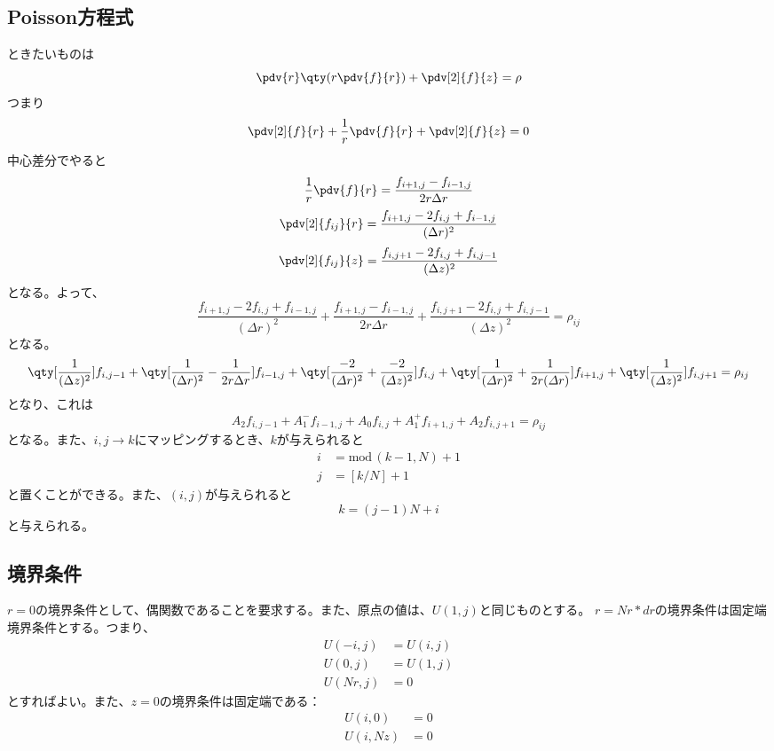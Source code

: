 \documentclass[a4paper,11pt,titlepage,uplatex]{jsarticle}
\begin{document}
\subsection{Poisson方程式}
ときたいものは
\begin{equation}
  \pdv{r}\qty(r\pdv{f}{r}) + \pdv[2]{f}{z}  = \rho
\end{equation}
つまり
\begin{equation}
  \pdv[2]{f}{r} + \frac{1}{r}\pdv{f}{r} + \pdv[2]{f}{z} = 0
\end{equation}
中心差分でやると
\begin{equation}
  \frac{1}{r}\pdv{f}{r} = \frac{f_{i+1,j}-f_{i-1,j}}{2r\Delta r}
\end{equation}
\begin{equation}
  \pdv[2]{f_{ij}}{r} = \frac{f_{i+1,j}-2f_{i,j}+f_{i-1,j}}{(\Delta r)^2}
\end{equation}
\begin{equation}
  \pdv[2]{f_{ij}}{z} = \frac{f_{i,j+1}-2f_{i,j}+f_{i,j-1}}{(\Delta z)^2}
\end{equation}
となる。よって、
\begin{equation}
  \frac{f_{i+1,j}-2f_{i,j}+f_{i-1,j}}{(\Delta r)^2} 
  +\frac{f_{i+1,j}-f_{i-1,j}}{2r\Delta r}
  +\frac{f_{i,j+1}-2f_{i,j}+f_{i,j-1}}{(\Delta z)^2} = \rho_{ij}
\end{equation}
となる。
\begin{equation}
  \qty[\frac{1}{(\Delta z)^2}]f_{i,j-1}+\qty[\frac{1}{(\Delta r)^2}-\frac{1}{2r\Delta r}]f_{i-1,j} + \qty[\frac{-2}{(\varDelta r)^2} + \frac{-2}{(\varDelta z)^2}]f_{i,j}
  + \qty[\frac{1}{(\varDelta r)^2} + \frac{1}{2r(\varDelta r)}]f_{i+1,j} + \qty[\frac{1}{(\varDelta z)^2}]f_{i,j+1} = \rho_{ij}
\end{equation}
となり、これは
\begin{equation}
  A_{2}f_{i,j-1}+A_{1}^{-}f_{i-1,j} + A_0f_{i,j} + A_{1}^{+}f_{i+1,j} + A_{2}f_{i,j+1} = \rho_{ij}
\end{equation}
となる。また、$i,j\to k$にマッピングするとき、$k$が与えられると
\begin{align}
  i &= \mathrm{mod}\,(k-1,N)+1 \\
  j &= [k/N]+1 
\end{align}
と置くことができる。また、$(i,j)$が与えられると
\begin{equation}
  k = (j-1)N + i
\end{equation}
と与えられる。
\subsection{境界条件}
$r=0$の境界条件として、偶関数であることを要求する。また、原点の値は、$U(1,j)$と同じものとする。
$r=Nr*dr$の境界条件は固定端境界条件とする。つまり、
\begin{align}
  U(-i,j) &= U(i,j) \\
  U(0,j)  &= U(1,j) \\
  U(Nr,j) &= 0 
\end{align}
とすればよい。また、$z=0$の境界条件は固定端である：
\begin{align}
  U(i,0) &= 0 \\
  U(i,Nz) &= 0
\end{align}
\end{document}
